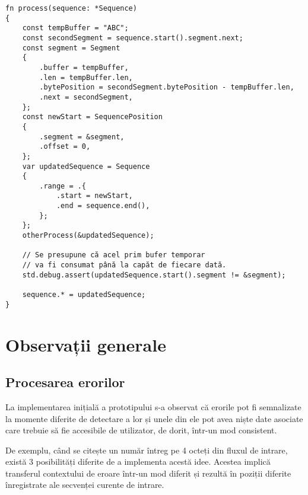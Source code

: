 \documentclass[a4paper,12pt]{report}
\begin{document}
\begin{verbatim}
fn process(sequence: *Sequence)
{
    const tempBuffer = "ABC";
    const secondSegment = sequence.start().segment.next;
    const segment = Segment
    {
        .buffer = tempBuffer,
        .len = tempBuffer.len,
        .bytePosition = secondSegment.bytePosition - tempBuffer.len,
        .next = secondSegment,
    };
    const newStart = SequencePosition
    {
        .segment = &segment,
        .offset = 0,
    };
    var updatedSequence = Sequence
    {
        .range = .{
            .start = newStart,
            .end = sequence.end(),
        };
    };
    otherProcess(&updatedSequence);

    // Se presupune că acel prim bufer temporar
    // va fi consumat până la capăt de fiecare dată.
    std.debug.assert(updatedSequence.start().segment != &segment);

    sequence.* = updatedSequence;
}
\end{verbatim}


\section{Observații generale}

\subsection{Procesarea erorilor}

La implementarea inițială a prototipului s-a observat că erorile pot fi semnalizate
la momente diferite de detectare a lor și unele din ele pot avea niște date asociate
care trebuie să fie accesibile de utilizator, de dorit, într-un mod consistent.

De exemplu, când se citește un număr întreg pe 4 octeți din fluxul de intrare,
există 3 posibilități diferite de a implementa acestă idee.
Acestea implică transferul contextului de eroare într-un mod diferit și
rezultă în poziții diferite înregistrate ale secvenței curente de intrare.
\end{document}
